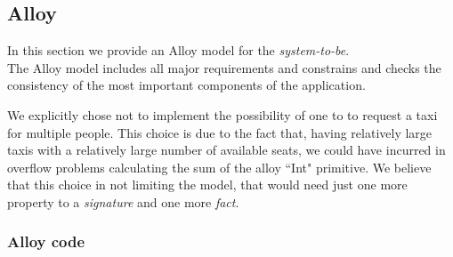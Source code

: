 \newpage
\subsection{Alloy} %
In this section we provide an Alloy model for the \emph{system-to-be}.\\
The Alloy model includes all major requirements and constrains and checks the consistency of the most important components of the application.

We explicitly chose not to implement the possibility of one \emph{} to to request a taxi for multiple people. This choice is due to the fact that, having relatively large taxis with a relatively large number of available seats, we could have incurred in overflow problems calculating the sum of the alloy ``Int" primitive.
We believe that this choice in not limiting the model, that would need just one more property to a \emph{signature} and one more \emph{fact}.
\newpage

\subsubsection{Alloy code}




